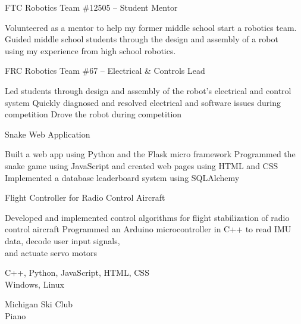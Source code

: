 \begin{rsection}
    FTC Robotics Team \#12505 -- Student Mentor 
    \begin{rlist}
        \ritem Volunteered as a mentor to help my former middle school start a robotics team.
        \ritem Guided middle school students through the design and assembly of a robot \\ using my experience from high school robotics.
    \end{rlist}
    FRC Robotics Team \#67 -- Electrical \& Controls Lead 
    \begin{rlist}
        \ritem Led students through design and assembly of the robot's electrical and control system
        \ritem Quickly diagnosed and resolved electrical and software issues during competition
        \ritem Drove the robot during competition
    \end{rlist}
\end{rsection}


\begin{rsection}
    Snake Web Application \hspace{5pt}  
    \begin{rlist}
        \ritem Built a web app using Python and the Flask micro framework
        \ritem Programmed the snake game using JavaScript and created web pages using HTML and CSS
        \ritem Implemented a database leaderboard system using SQLAlchemy
    \end{rlist}
    Flight Controller for Radio Control Aircraft 
    \begin{rlist}
        \ritem Developed and implemented control algorithms for flight stabilization of radio control aircraft
        \ritem Programmed an Arduino microcontroller in C++ to read IMU data, decode user input signals, \\ and actuate servo motors
    \end{rlist}
\end{rsection}


\begin{rsection}
    C++, Python, JavaScript, HTML, CSS \\
    Windows, Linux
\end{rsection}


\begin{rsection}
    Michigan Ski Club  \\
    Piano 
\end{rsection}



